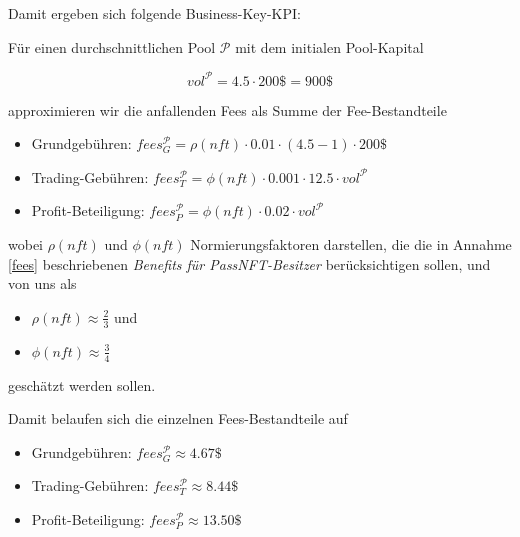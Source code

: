 \vspace{0.5cm}

Damit ergeben sich folgende Business-Key-KPI:

\vspace{0.3cm}

\begin{Fazit}

Für einen durchschnittlichen Pool $\mathcal{P}$ mit dem initialen Pool-Kapital

\begin{equation*}
  vol^{\mathcal{P}} = 4.5 \cdot 200\$ = 900\$ 
\end{equation*}

approximieren wir die anfallenden Fees als Summe der Fee-Bestandteile

\begin{itemize}
	\item Grundgebühren: $fees_{G}^{\mathcal{P}} = \rho(nft) \cdot 0.01 \cdot (4.5 - 1) \cdot 200\$ $
	\item Trading-Gebühren: $fees_{T}^{\mathcal{P}} = \phi(nft) \cdot 0.001 \cdot 12.5 \cdot vol^{\mathcal{P}} $
	\item Profit-Beteiligung: $fees_{P}^{\mathcal{P}} = \phi(nft) \cdot 0.02 \cdot vol^{\mathcal{P}} $
\end{itemize}

wobei $\rho(nft)$ und $\phi(nft)$ Normierungsfaktoren darstellen, die die in Annahme \ref{fees} beschriebenen \textit{Benefits für PassNFT-Besitzer} berücksichtigen sollen, und von uns als 

\begin{itemize}
	\item $\rho(nft) \approx \frac{2}{3}$ und 
	\item $\phi(nft) \approx \frac{3}{4}$
\end{itemize}	

geschätzt werden sollen.

\vspace{0.2cm}

Damit belaufen sich die einzelnen Fees-Bestandteile auf 

\begin{itemize}
	\item Grundgebühren: $fees_{G}^{\mathcal{P}} \approx 4.67\$ $
	\item Trading-Gebühren: $fees_{T}^{\mathcal{P}} \approx 8.44 \$ $
	\item Profit-Beteiligung: $fees_{P}^{\mathcal{P}} \approx 13.50 \$ $
\end{itemize}


\end{Fazit}
